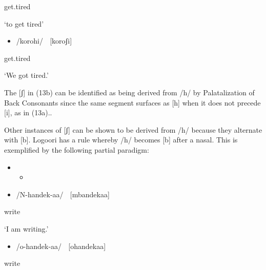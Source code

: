 \documentclass[output=paper]{langsci/langscibook}
\begin{document}
get.tired

‘to get tired’ \citep[38]{Leung1991}

\begin{itemize}
\item /korohi/    [koroʃi]

\end{itemize}

get.tired

‘We got tired.’ \citep[38]{Leung1991}

The [ʃ] in (13b) can be identified as being derived from /h/ by Palatalization of Back Consonants since the same segment surfaces as [h] when it does not precede [i], as in (13a).. 

Other instances of [ʃ] can be shown to be derived from /h/ because they alternate with [b]. Logoori has a rule whereby /h/ becomes [b] after a nasal. This is exemplified by the following partial paradigm:

\setcounter{itemize}{0}
\begin{itemize}
\item \setcounter{itemize}{0}
\begin{itemize}
\item \end{itemize}
\end{itemize}
\setcounter{itemize}{0}
\begin{itemize}
\item \begin{styleListParagraph}
/N-handek-aa/    [mbandekaa]
\end{styleListParagraph}
\end{itemize}
\begin{styleListParagraph}
write
\end{styleListParagraph}

‘I am writing.’

\begin{itemize}
\item \begin{styleListParagraph}
/o-handek-aa/    [ohandekaa]
\end{styleListParagraph}
\end{itemize}
\begin{styleListParagraph}
write
\end{styleListParagraph}
\end{document}
